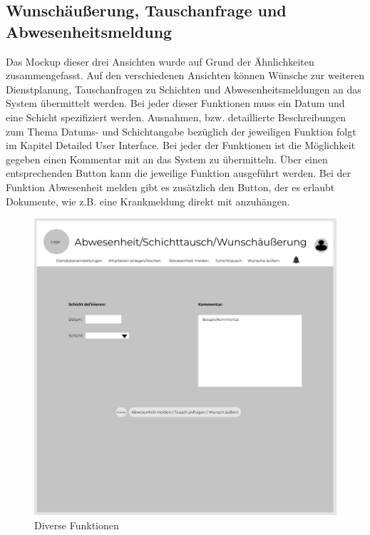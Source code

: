 \documentclass[11pt,
paper=a4,
bibtotocnumbered,	  %
liststotocnumbered,  %
DIV=calc,		  %
tablecaptionabove,	  %
headinclude,
]{article}
\begin{document}
\subsection{Wunschäußerung, Tauschanfrage und Abwesenheitsmeldung}
Das Mockup dieser drei Ansichten wurde auf Grund der Ähnlichkeiten zusammengefasst. Auf den verschiedenen Ansichten können Wünsche zur weiteren Dienstplanung, Tauschanfragen zu Schichten und Abwesenheitsmeldungen an das System übermittelt werden. Bei jeder dieser Funktionen muss ein Datum und eine Schicht spezifiziert werden. Ausnahmen, bzw. detaillierte Beschreibungen zum Thema Datums- und Schichtangabe bezüglich der jeweiligen Funktion folgt im Kapitel Detailed User Interface. Bei jeder der Funktionen ist die Möglichkeit gegeben einen Kommentar mit an das System zu übermitteln. Über einen entsprechenden Button kann die jeweilige Funktion ausgeführt werden. Bei der Funktion Abwesenheit melden gibt es zusätzlich den Button, der es erlaubt Dokumente, wie z.B. eine Krankmeldung direkt mit anzuhängen. 
\begin{figure}[H]
\includegraphics[scale=1]{Bilder/Abwesenheit_Schichttausch_Wunsch.jpg}
\caption{Diverse Funktionen}
\end{figure}
\end{document}
